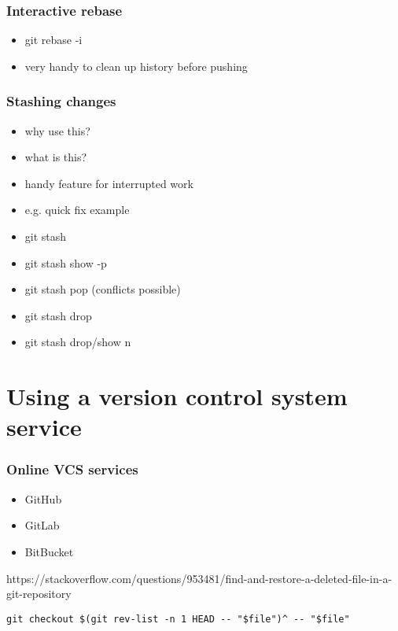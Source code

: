 \documentclass{git_course}
\begin{document}
\begin{frame}
\frametitle{Interactive rebase}
\begin{itemize}
    \item git rebase -i
    \item very handy to clean up history before pushing
\end{itemize}
\end{frame}

\begin{frame}
\frametitle{Stashing changes}
\begin{itemize}
    \item why use this?
    \item what is this?
    \item handy feature for interrupted work
    \item e.g. quick fix example
    \item git stash
    \item git stash show -p
    \item git stash pop (conflicts possible)
    \item git stash drop
    \item git stash drop/show {n}
\end{itemize}
\end{frame}

\section{Using a version control system service}

\begin{frame}
    \frametitle{Online VCS services}
    \begin{itemize}
        \item GitHub
        \item GitLab
        \item BitBucket
    \end{itemize}
\end{frame}


https://stackoverflow.com/questions/953481/find-and-restore-a-deleted-file-in-a-git-repository

\begin{verbatim}
git checkout $(git rev-list -n 1 HEAD -- "$file")^ -- "$file"
\end{verbatim}
\end{document}
